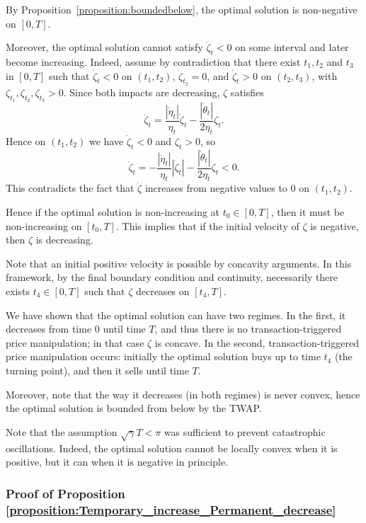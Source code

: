 \documentclass[final,3p,authoryear,12pt]{elsarticle}
\begin{document}
By Proposition~\ref{proposition:boundedbelow}, the optimal solution is
non-negative on $[0,T]$.

Moreover, the optimal solution cannot satisfy $\dot \zeta_{t} < 0$ on some
interval and later become increasing. Indeed, assume by contradiction that
there exist $t_{1},t_{2}$ and $t_{3}$ in $[0,T]$ such that $\dot \zeta_{t} < 0$ on
$(t_{1},t_{2})$, $\dot \zeta_{t_{2}}=0$, and $\dot \zeta_{t} > 0$ on $(t_{2},t_{3})$,
with $\zeta_{t_{1}},\zeta_{t_{2}},\zeta_{t_{3}}>0$. Since both impacts are
decreasing, $\zeta$ satisfies
\[
\ddot \zeta_{t}
=\frac{|\dot \eta_{t}|}{\eta_{t}}\dot \zeta_{t}
-\frac{|\dot \theta_{t}|}{2\eta_{t}}\zeta_{t}.
\]
Hence on $(t_{1},t_{2})$ we have $\dot \zeta_t<0$ and $\zeta_t>0$, so
\[
\ddot \zeta_{t}
=-\frac{|\dot \eta_{t}|}{\eta_{t}}|\dot \zeta_{t}|
-\frac{|\dot \theta_{t}|}{2\eta_{t}}\zeta_{t}<0.
\]
This contradicts the fact that $\dot\zeta$ increases from negative values to
$0$ on $(t_{1},t_{2})$.

Hence if the optimal solution is non-increasing at $t_{0}\in[0,T]$, then it must be non-increasing on $[t_{0},T]$.
This implies that if the initial velocity of $\zeta$ is negative, then $\zeta$ is decreasing. 

Note that an initial positive velocity is possible by concavity arguments. In this framework, by the final boundary condition and continuity, necessarily there exists $t_{4}\in[0,T]$ such that $\zeta$ decreases on $[t_{4},T]$.

We have shown that the optimal solution can have two regimes. In the first, it
decreases from time $0$ until time $T$, and thus there is no
transaction-triggered price manipulation; in that case $\zeta$ is concave. In
the second, transaction-triggered price manipulation occurs: initially the
optimal solution buys up to time $t_{4}$ (the turning point), and then it sells
until time $T$.

Moreover, note that the way it decreases (in both regimes) is never convex, hence the optimal solution is bounded from below by the TWAP. 

Note that the assumption $\sqrt{\gamma}T<\pi$ was sufficient to prevent
catastrophic oscillations. Indeed, the optimal solution cannot be locally convex
when it is positive, but it can when it is negative in principle.

\subsubsection{Proof of Proposition \ref{proposition:Temporary_increase_Permanent_decrease}}
\end{document}
